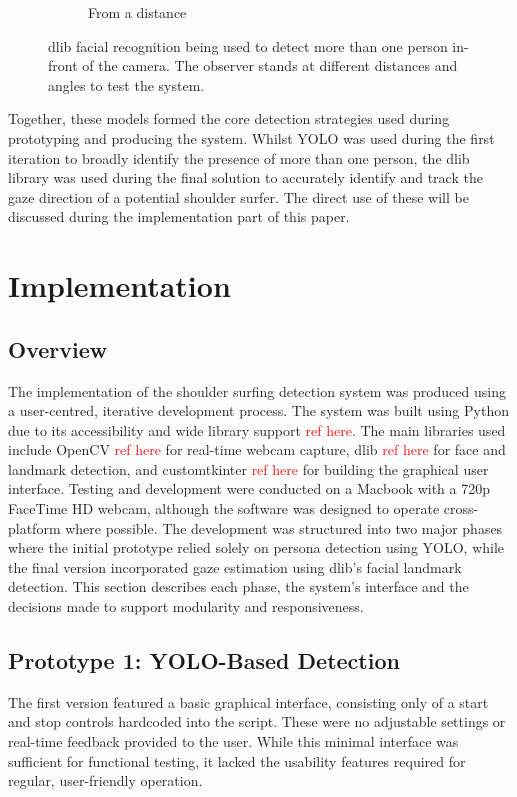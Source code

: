 \documentclass[12pt]{article}
\theoremstyle{plain}
\theoremstyle{definition}
\begin{document}
\begin{figure}[h!]
\begin{subfigure}[b]{0.3\textwidth}
         \caption{From a distance}
         \label{fig:face_c}
     \end{subfigure}
        \caption{dlib facial recognition being used to detect more than one person in-front of the camera. The observer stands at different distances and angles to test the system.}
        \label{fig:dlib}
\end{figure}

Together, these models formed the core detection strategies used during prototyping and producing the system. Whilst YOLO was used during the first iteration to broadly identify the presence of more than one person, the dlib library was used during the final solution to accurately identify and track the gaze direction of a potential shoulder surfer. The direct use of these will be discussed during the implementation part of this paper.

\section{Implementation}
\subsection{Overview}

The implementation of the shoulder surfing detection system was produced using a user-centred, iterative development process. The system was built using Python due to its accessibility and wide library support \textcolor{red}{ref here}. The main libraries used include OpenCV \textcolor{red}{ref here} for real-time webcam capture, dlib \textcolor{red}{ref here} for face and landmark detection, and customtkinter \textcolor{red}{ref here} for building the graphical user interface. Testing and development were conducted on a Macbook with a 720p FaceTime HD webcam, although the software was designed to operate cross-platform where possible.
The development was structured into two major phases where the initial prototype relied solely on persona detection using YOLO, while the final version incorporated gaze estimation using dlib’s facial landmark detection. This section describes each phase, the system’s interface and the decisions made to support modularity and responsiveness.

\subsection{Prototype 1: YOLO-Based Detection}

The first version featured a basic graphical interface, consisting only of a start and stop controls hardcoded into the script. These were no adjustable settings or real-time feedback provided to the user. While this minimal interface was sufficient for functional testing, it lacked the usability features required for regular, user-friendly operation.
\end{document}
